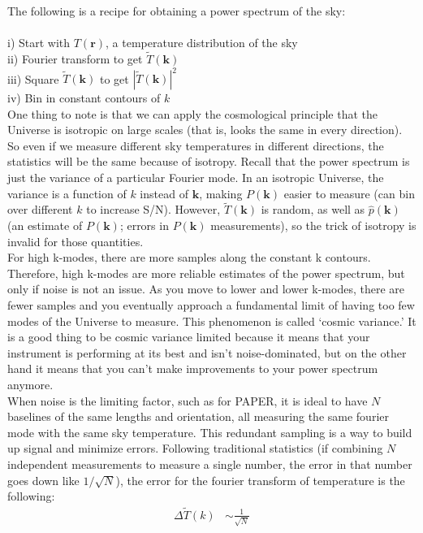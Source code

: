 \documentclass[12pt]{article}
\begin{document}
\noindent The following is a recipe for obtaining a power spectrum of the sky: \\ \\
i) Start with $T(\boldsymbol{r})$, a temperature distribution of the sky \\
ii) Fourier transform to get $\tilde{T}(\boldsymbol{k})$ \\
iii) Square $\tilde{T}(\boldsymbol{k})$ to get $|\tilde{T}(\boldsymbol{k})|^{2}$ \\
iv) Bin in constant contours of $k$ \\

\noindent One thing to note is that we can apply the cosmological principle that the Universe is isotropic on large scales (that is, looks the same in every direction). So even if we measure different sky temperatures in different directions, the statistics will be the same because of isotropy. Recall that the power spectrum is just the variance of a particular Fourier mode. In an isotropic Universe, the variance is a function of $k$ instead of $\boldsymbol{k}$, making $P(\boldsymbol{k})$ easier to measure (can bin over different $k$ to increase S/N). However, $\tilde{T}(\boldsymbol{k})$ is random, as well as $\hat{p}(\boldsymbol{k})$ (an estimate of $P(\boldsymbol{k})$; errors in $P(\boldsymbol{k})$ measurements), so the trick of isotropy is invalid for those quantities. \\

\noindent For high k-modes, there are more samples along the constant k contours. Therefore, high k-modes are more reliable estimates of the power spectrum, but only if noise is not an issue. As you move to lower and lower k-modes, there are fewer samples and you eventually approach a fundamental limit of having too few modes of the Universe to measure. This phenomenon is called `cosmic variance.' It is a good thing to be cosmic variance limited because it means that your instrument is performing at its best and isn't noise-dominated, but on the other hand it means that you can't make improvements to your power spectrum anymore. \\

\noindent When noise is the limiting factor, such as for PAPER, it is ideal to have $N$ baselines of the same lengths and orientation, all measuring the same fourier mode with the same sky temperature. This redundant sampling is a way to build up signal and minimize errors. Following traditional statistics (if combining $N$ independent measurements to measure a single number, the error in that number goes down like $1/\sqrt{N}$), the error for the fourier transform of temperature is the following:
\begin{align}
\Delta \tilde{T}(k) &\sim {\frac{1}{\sqrt{N}}} 
\end{align}
\end{document}
